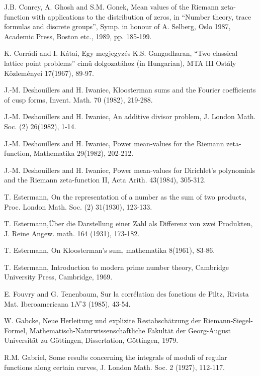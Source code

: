 \begin{thebibliography}{99}
 J.B. Conrey, A. Ghosh and S.M. Gonek, Mean values of the Riemann zeta-function with applications to the distribution of zeros, in ``Number theory, trace formulas and discrete groups'', Symp. in honour of A. Selberg, Oslo 1987, Academic Press, Boston etc., 1989, pp. 185-199.

 K. Corr\'adi and I. K\'atai, Egy megjegyz\'es K.S. Gangadharan, ``Two classical lattice point problems'' cim\"u dolgozat\'ahoz (in Hungarian), MTA III Ost\'aly K\"ozlem\'enyei 17(1967), 89-97.

 J.-M. Deshouillers and H. Iwaniec, Kloosterman sums and the Fourier coefficients of cusp forms, Invent. Math. 70 (1982), 219-288.

 J.-M. Deshouillers and H. Iwaniec, An additive divisor problem, J. London Math. Soc. (2) 26(1982), 1-14.

 J.-M. Deshouillers and H. Iwaniec, Power mean-values for the Riemann zeta-function, Mathematika 29(1982), 202-212.

 J.-M. Deshouillers and H. Iwaniec, Power mean-values for Dirichlet's polynomials and the  Riemann zeta-function II, Acta Arith. 43(1984), 305-312.

 T. Estermann, On the representation of a number as the sum of two products, Proc. London Math. Soc. (2) 31(1930), 123-133.

 T. Estermann,\pageoriginale \"Uber die Darstellung einer Zahl als Differenz von zwei Produkten, J. Reine Angew. math. 164 (1931), 173-182.

 T. Estermann, On Kloosterman's sum, mathematika 8(1961), 83-86.

 T. Estermann, Introduction to modern prime number theory, Cambridge University Press, Cambridge, 1969.

 E. Fouvry and G. Tenenbaum, Sur la corr\'elation des fonctions de Piltz, Rivista Mat. Iberoamericana $1 N^\circ 3$ (1985), 43-54.

 W. Gabcke, Neue Herleitung und explizite Restabsch\"atzung der Riemann-Siegel-Formel, Mathematisch-Naturwissenschaftliche Fakult\"at der Georg-August Universit\"at zu G\"ottingen, Dissertation, G\"ottingen, 1979.

 R.M. Gabriel, Some results concerning the integrals of moduli of regular functions along certain curves, J. London Math. Soc. 2 (1927), 112-117.


\end{thebibliography}
